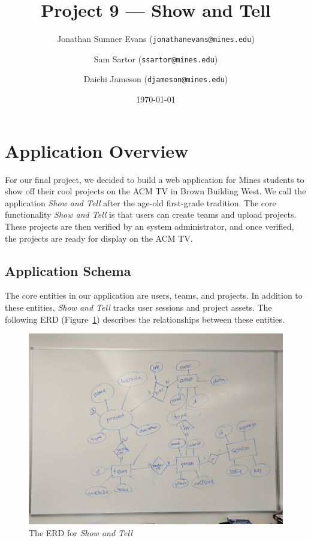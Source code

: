 \documentclass[12pt]{article}
\title{Project 9 --- Show and Tell}
\author{
    Jonathan Sumner Evans (\texttt{jonathanevans@mines.edu})
    \and
    Sam Sartor (\texttt{ssartor@mines.edu})
    \and
    Daichi Jameson (\texttt{djameson@mines.edu})
}
\date{\today}
\newcommand{\app}{\textit{Show and Tell}\xspace}
\begin{document}
\maketitle

\section{Application Overview}
For our final project, we decided to build a web application for Mines students
to show off their cool projects on the ACM TV in Brown Building West. We call
the application \app after the age-old first-grade tradition. The core
functionality \app is that users can create teams and upload projects. These
projects are then verified by an system administrator, and once verified, the
projects are ready for display on the ACM TV.


\subsection{Application Schema}
The core entities in our application are users, teams, and projects. In addition
to these entities, \app tracks user sessions and project assets. The following
ERD (Figure~\ref{fig:erd}) describes the relationships between these entities.

\begin{figure}[H]
    \includegraphics[width=\textwidth]{erd}
    \caption{The ERD for \app}
    \label{fig:erd}
\end{figure}
\end{document}
